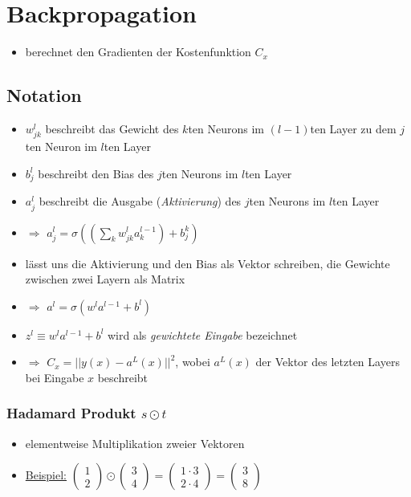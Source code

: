 \section{Backpropagation}

\begin{itemize}
\item berechnet den Gradienten der Kostenfunktion $C_x$
\end{itemize}

\subsection{Notation}

\begin{itemize}
  \item $w_{jk}^l$ beschreibt das Gewicht des $k$ten Neurons im $(l-1)$ten Layer zu dem $j$ten Neuron im $l$ten Layer
  \item $b_j^l$ beschreibt den Bias des $j$ten Neurons im $l$ten Layer
  \item $a_j^l$ beschreibt die Ausgabe (\emph{Aktivierung}) des $j$ten Neurons im $l$ten Layer
  \item $\Rightarrow$ $a_j^l = \sigma {( {(\sum_k w_{jk}^l a_k^{l-1})} + b_j^k)}$
  \item lässt uns die Aktivierung und den Bias als Vektor schreiben, die Gewichte zwischen zwei Layern als Matrix
  \item $\Rightarrow$ $a^l = \sigma {(w^l a^{l-1} + b^l)}$
  \item $z^l \equiv w^l a^{l-1}+b^l$ wird als \emph{gewichtete Eingabe} bezeichnet
  \item $\Rightarrow$ $C_x = ||y(x) - a^L(x)||^2$, wobei $a^L(x)$ der Vektor des letzten Layers bei Eingabe $x$ beschreibt
\end{itemize}

\subsubsection{Hadamard Produkt $s \odot t$}

\begin{itemize}
  \item elementweise Multiplikation zweier Vektoren
  \item \underline{Beispiel:} $\begin{pmatrix}1\\2\end{pmatrix} \odot \begin{pmatrix}3\\4\end{pmatrix}=\begin{pmatrix}1 \cdot 3\\2 \cdot 4\end{pmatrix}=\begin{pmatrix}3\\8\end{pmatrix}$
\end{itemize}


